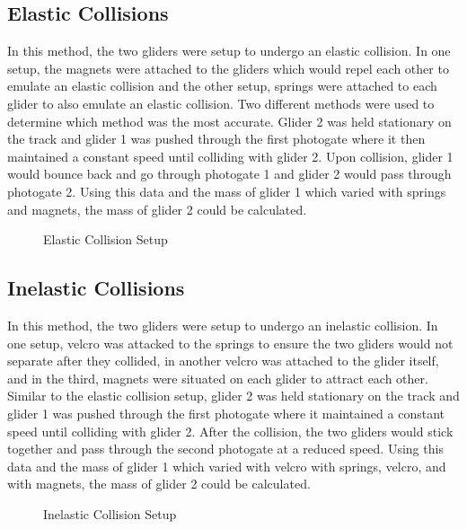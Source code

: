 \documentclass[12pt]{article}
\begin{document}
\subsection{Elastic Collisions}
In this method, the two gliders were setup to undergo an elastic collision. In one setup, the magnets were attached to the gliders which would repel each other to emulate an elastic collision and the other setup, springs were attached to each glider to also emulate an elastic collision. Two different methods were used to determine which method was the most accurate. Glider 2 was held stationary on the track and glider 1 was pushed through the first photogate where it then maintained a constant speed until colliding with glider 2. Upon collision, glider 1 would bounce back and go through photogate 1 and glider 2 would pass through photogate 2. Using this data and the mass of glider 1 which varied with springs and magnets, the mass of glider 2 could be calculated.
\begin{figure}[H] %
    \centering
    
    \caption{Elastic Collision Setup}
\end{figure}
\subsection{Inelastic Collisions}
In this method, the two gliders were setup to undergo an inelastic collision. In one setup, velcro was attacked to the springs to ensure the two gliders would not separate after they collided, in another velcro was attached to the glider itself, and in the third, magnets were situated on each glider to attract each other. Similar to the elastic collision setup, glider 2 was held stationary on the track and glider 1 was pushed through the first photogate where it maintained a constant speed until colliding with glider 2. After the collision, the two gliders would stick together and pass through the second photogate at a reduced speed. Using this data and the mass of glider 1 which varied with velcro with springs, velcro, and with magnets, the mass of glider 2 could be calculated.
\begin{figure}[H]   %
    \centering
    \caption{Inelastic Collision Setup}
\end{figure}
\end{document}

